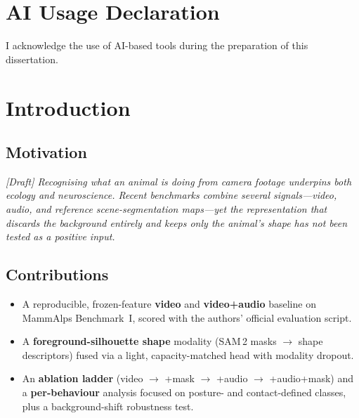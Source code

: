 \documentclass[12pt,a4paper]{report}
\begin{document}
\chapter*{AI Usage Declaration}
I acknowledge the use of AI-based tools during the preparation of this dissertation.

\tableofcontents

\clearpage
{}

\chapter{Introduction}
\label{ch:introduction}

\section{Motivation}
\textit{[Draft] Recognising what an animal is doing from camera footage underpins both
ecology and neuroscience. Recent benchmarks combine several signals---video, audio, and
reference scene-segmentation maps---yet the representation that discards the background
entirely and keeps only the animal's shape has not been tested as a positive input.}

\section{Contributions}
\begin{itemize}
  \item A reproducible, frozen-feature \textbf{video} and \textbf{video+audio} baseline on
        MammAlps Benchmark~I, scored with the authors' official evaluation script.
  \item A \textbf{foreground-silhouette shape} modality (SAM\,2 masks $\rightarrow$ shape
        descriptors) fused via a light, capacity-matched head with modality dropout.
  \item An \textbf{ablation ladder} (video $\rightarrow$ +mask $\rightarrow$ +audio
        $\rightarrow$ +audio+mask) and a \textbf{per-behaviour} analysis focused on
        posture- and contact-defined classes, plus a background-shift robustness test.
\end{itemize}
\end{document}
